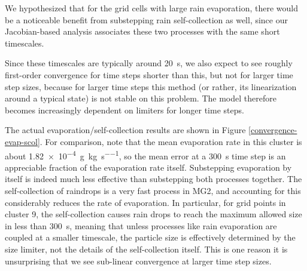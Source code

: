 \documentclass [11pt, proquest] {uwthesis}[2020/02/24]
\begin{document}
We hypothesized that for the grid cells with large rain evaporation, there would be a noticeable benefit from substepping rain self-collection as well, since our Jacobian-based analysis associates these two processes with the same short timescales.

Since these timescales are typically around \SI{20}{\second}, we also expect to see roughly first-order convergence for time steps shorter than this, but not for larger time step sizes, because for larger time steps this method (or rather, its linearization around a typical state) is not stable on this problem. The model therefore becomes increasingly dependent on limiters for longer time steps.

The actual evaporation/self-collection results are shown in Figure \ref{convergence-evap-scol}. For comparison, note that the mean evaporation rate in this cluster is about \SI{1.82e-4}{\gram\per\kilo\gram\per\second}, so the mean error at a \SI{300}{\second} time step is an appreciable fraction of the evaporation rate itself. Substepping evaporation by itself is indeed much less effective than substepping both processes together. The self-collection of raindrops is a very fast process in MG2, and accounting for this considerably reduces the rate of evaporation. In particular, for grid points in cluster 9, the self-collection causes rain drops to reach the maximum allowed size in less than \SI{300}{\second}, meaning that unless processes like rain evaporation are coupled at a smaller timescale, the particle size is effectively determined by the size limiter, not the details of the self-collection itself. This is one reason it is unsurprising that we see sub-linear convergence at larger time step sizes.
\end{document}
